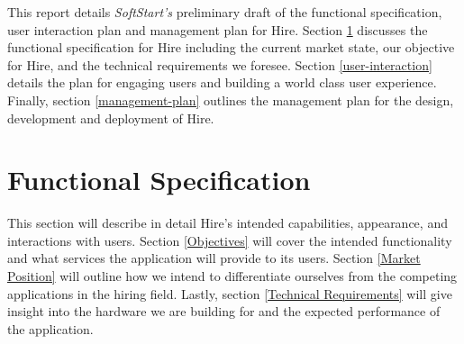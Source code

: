 \documentclass[11pt]{article}
\begin{document}

This report details \textit{SoftStart's} preliminary draft of the functional specification, user interaction plan and management plan for Hire. Section \ref{functional-spec} discusses the functional specification for Hire including the current market state, our objective for Hire, and the technical requirements we foresee. Section \ref{user-interaction} details the plan for engaging users and building a world class user experience. Finally, section \ref{management-plan} outlines the management plan for the design, development and deployment of Hire.

%
\section{Functional Specification}\label{functional-spec}


This section will describe in detail Hire's intended capabilities, appearance, and interactions with users. Section \ref{Objectives} will cover the intended functionality and what services the application will provide to its users. Section \ref{Market Position} will outline how we intend to differentiate ourselves from the competing applications in the hiring field. Lastly, section \ref{Technical Requirements} will give insight into the hardware we are building for and the expected performance of the application.
\end{document}
